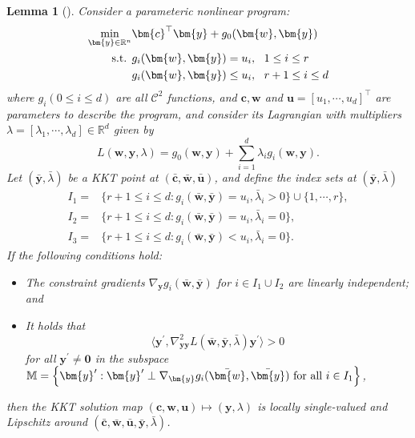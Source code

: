 \documentclass{amsart} %
\def\vzero{{\bm{0}}}
\def\vc{{\bm{c}}}
\def\vu{{\bm{u}}}
\def\vw{{\bm{w}}}
\def\vy{{\bm{y}}}
\def\sM{{\mathbb{M}}}
\def\sR{{\mathbb{R}}}
\def\cC{{\mathcal{C}}}
\newtheorem{lemma}[theorem]{Lemma}
\theoremstyle{definition}
\theoremstyle{remark}
\begin{document}
\begin{lemma}[\cite{dontchev1996characterizations}]
\label{lemma:lp-regular}
Consider a parameteric nonlinear program:
\begin{align*}
\min_{\vy\in\sR^n} & \vc^\top \vy + g_0(\vw,\vy) \\
\textup{s.t. } & g_i(\vw,\vy)=u_i, ~~ 1 \leq i \leq r \\
& g_i(\vw,\vy)\leq u_i, ~~ r+1 \leq i \leq d
\end{align*}
where $g_i (0 \leq i \leq d)$ are all $\cC^2$ functions, and $\vc,\vw$ and $\vu=[u_1,\cdots,u_d]^\top$ are parameters to describe the program, and consider its Lagrangian with multipliers $\lambda=[\lambda_1,\cdots,\lambda_d] \in \sR^d$ given by
\[L(\vw,\vy,\lambda) = g_0(\vw,\vy) + \sum_{i=1}^{d} \lambda_i g_i(\vw, \vy).\]
Let $(\bar{\vy},\bar{\lambda})$ be a KKT point at $(\bar{\vc},\bar{\vw},\bar{\vu})$, and define the index sets at $(\bar{\vy},\bar{\lambda})$
\[
\begin{aligned}
I_1 = & \Big\{r+1 \leq i \leq d: g_i(\bar{\vw},\bar{\vy})=u_i, \bar{\lambda}_i > 0 \Big\} \cup \Big\{1,\cdots,r\Big\}, \\
I_2 = & \Big\{r+1 \leq i \leq d: g_i(\bar{\vw},\bar{\vy})=u_i, \bar{\lambda}_i = 0 \Big\}, \\
I_3 = & \Big\{r+1 \leq i \leq d: g_i(\bar{\vw},\bar{\vy}) < u_i, \bar{\lambda}_i = 0 \Big\}.
\end{aligned}
\]
If the following conditions hold:
\begin{itemize}
\item The constraint gradients $\nabla_\vy g_i(\bar{\vw},\bar{\vy})$ for $i \in I_1 \cup I_2$ are linearly independent; and
\item It holds that
\[ \langle \vy^\prime, \nabla^2_{\vy\vy}L(\bar{\vw},\bar{\vy},\bar{\lambda}) \vy^\prime \rangle > 0 \]
for all $\vy^\prime \neq \vzero$ in the subspace $\sM=\Big\{ \vy^\prime: \vy^\prime \perp \nabla_\vy g_i(\bar{\vw},\bar{\vy}) \textup{ for all } i \in I_1 \Big\}$,
\end{itemize}
then the KKT solution map $(\vc,\vw,\vu) \mapsto (\vy,\lambda)$ is locally single-valued and Lipschitz around $(\bar{\vc},\bar{\vw},\bar{\vu},\bar{\vy},\bar{\lambda})$.
\end{lemma}
\end{document}
